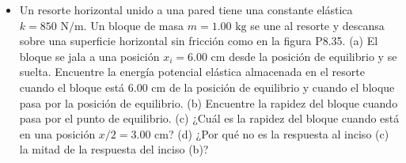 \documentclass[11pt,a4paper]{article}
\begin{document}
\begin{itemize}
    \item[\textbf{35.}] Un resorte horizontal unido a una pared tiene una constante elástica $k = 850 \text{ N/m}$. Un bloque de masa $m = 1.00 \text{ kg}$ se une al resorte y descansa sobre una superficie horizontal sin fricción como en la figura P8.35. (a) El bloque se jala a una posición $x_i = 6.00 \text{ cm}$ desde la posición de equilibrio y se suelta. Encuentre la energía potencial elástica almacenada en el resorte cuando el bloque está $6.00 \text{ cm}$ de la posición de equilibrio y cuando el bloque pasa por la posición de equilibrio. (b) Encuentre la rapidez del bloque cuando pasa por el punto de equilibrio. (c) ¿Cuál es la rapidez del bloque cuando está en una posición $x/2 = 3.00 \text{ cm}$? (d) ¿Por qué no es la respuesta al inciso (c) la mitad de la respuesta del inciso (b)?
    \vspace*{6cm}
\end{itemize}

\newpage
\end{document}

